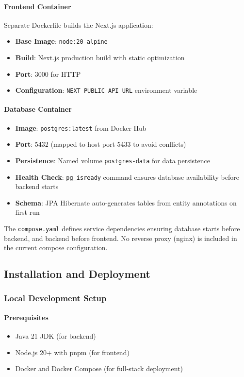 \paragraph{Frontend Container}
Separate Dockerfile builds the Next.js application:
\begin{itemize}
    \item \textbf{Base Image}: \texttt{node:20-alpine}
    \item \textbf{Build}: Next.js production build with static optimization
    \item \textbf{Port}: 3000 for HTTP
    \item \textbf{Configuration}: \texttt{NEXT\_PUBLIC\_API\_URL} environment variable
\end{itemize}

\paragraph{Database Container}
\begin{itemize}
    \item \textbf{Image}: \texttt{postgres:latest} from Docker Hub
    \item \textbf{Port}: 5432 (mapped to host port 5433 to avoid conflicts)
    \item \textbf{Persistence}: Named volume \texttt{postgres-data} for data persistence
    \item \textbf{Health Check}: \texttt{pg\_isready} command ensures database availability before backend starts
    \item \textbf{Schema}: JPA Hibernate auto-generates tables from entity annotations on first run
\end{itemize}

The \texttt{compose.yaml} defines service dependencies ensuring database starts before backend, and backend before frontend. No reverse proxy (nginx) is included in the current compose configuration.

\subsection{Installation and Deployment}
\label{subsec:installation-guide}

\subsubsection{Local Development Setup}
\label{subsubsec:dev-setup}

\paragraph{Prerequisites}
\begin{itemize}
    \item Java 21 JDK (for backend)
    \item Node.js 20+ with pnpm (for frontend)
    \item Docker and Docker Compose (for full-stack deployment)
\end{itemize}


